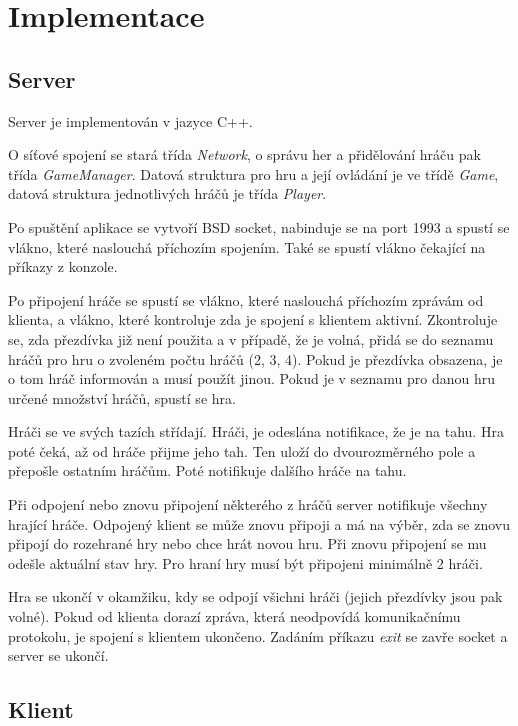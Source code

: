 \chapter{Implementace}

\section{Server}

Server je implementován v jazyce C++.

O síťové spojení se stará třída \emph{Network}, o správu her a přidělování hráču pak třída \emph{GameManager}. Datová struktura pro hru a její ovládání je ve třídě \emph{Game}, datová struktura jednotlivých hráčů je třída \emph{Player}.

Po spuštění aplikace se vytvoří BSD socket, nabinduje se na port 1993 a spustí se vlákno, které naslouchá příchozím spojením. Také se spustí vlákno čekající na příkazy z konzole.

Po připojení hráče se spustí se vlákno, které naslouchá příchozím zprávám od klienta, a vlákno, které kontroluje zda je spojení s klientem aktivní. Zkontroluje se, zda přezdívka již není použita a v případě, že je volná, přidá se do seznamu hráčů pro hru o zvoleném počtu hráčů (2, 3, 4). Pokud je přezdívka obsazena, je o tom hráč informován a musí použít jinou. Pokud je v seznamu pro danou hru určené množství hráčů, spustí se hra.

Hráči se ve svých tazích střídají. Hráči, je odeslána notifikace, že je na tahu. Hra poté čeká, až od hráče přijme jeho tah. Ten uloží do dvourozměrného pole a přepošle ostatním hráčům. Poté notifikuje dalšího hráče na tahu.

Při odpojení nebo znovu připojení některého z hráčů server notifikuje všechny hrající hráče. Odpojený klient se může znovu připoji a má na výběr, zda se znovu připojí do rozehrané hry nebo chce hrát novou hru. Při znovu připojení se mu odešle aktuální stav hry. Pro hraní hry musí být připojeni minimálně 2 hráči.

Hra se ukončí v okamžiku, kdy se odpojí všichni hráči (jejich přezdívky jsou pak volné). Pokud od klienta dorazí zpráva, která neodpovídá komunikačnímu protokolu, je spojení s klientem ukončeno. Zadáním příkazu \emph{exit} se zavře socket a server se ukončí.

\section{Klient}

